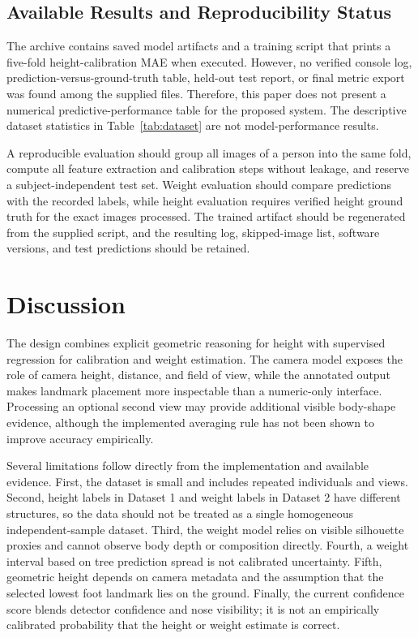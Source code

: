 \documentclass[conference]{IEEEtran}
\begin{document}
\subsection{Available Results and Reproducibility Status}
The archive contains saved model artifacts and a training script that prints a five-fold height-calibration MAE when executed. However, no verified console log, prediction-versus-ground-truth table, held-out test report, or final metric export was found among the supplied files. Therefore, this paper does not present a numerical predictive-performance table for the proposed system. The descriptive dataset statistics in Table~\ref{tab:dataset} are not model-performance results.

A reproducible evaluation should group all images of a person into the same fold, compute all feature extraction and calibration steps without leakage, and reserve a subject-independent test set. Weight evaluation should compare predictions with the recorded labels, while height evaluation requires verified height ground truth for the exact images processed. The trained artifact should be regenerated from the supplied script, and the resulting log, skipped-image list, software versions, and test predictions should be retained.

\section{Discussion}
The design combines explicit geometric reasoning for height with supervised regression for calibration and weight estimation. The camera model exposes the role of camera height, distance, and field of view, while the annotated output makes landmark placement more inspectable than a numeric-only interface. Processing an optional second view may provide additional visible body-shape evidence, although the implemented averaging rule has not been shown to improve accuracy empirically.

Several limitations follow directly from the implementation and available evidence. First, the dataset is small and includes repeated individuals and views. Second, height labels in Dataset 1 and weight labels in Dataset 2 have different structures, so the data should not be treated as a single homogeneous independent-sample dataset. Third, the weight model relies on visible silhouette proxies and cannot observe body depth or composition directly. Fourth, a weight interval based on tree prediction spread is not calibrated uncertainty. Fifth, geometric height depends on camera metadata and the assumption that the selected lowest foot landmark lies on the ground. Finally, the current confidence score blends detector confidence and nose visibility; it is not an empirically calibrated probability that the height or weight estimate is correct.
\end{document}
